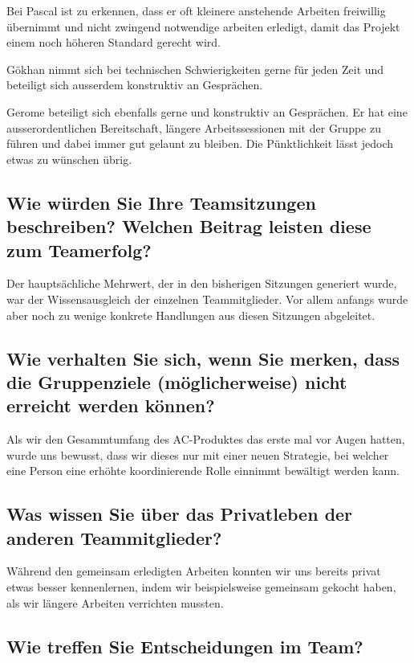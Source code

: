 Bei Pascal ist zu erkennen, dass er oft kleinere anstehende Arbeiten freiwillig übernimmt und nicht zwingend notwendige arbeiten erledigt, damit das Projekt einem noch höheren Standard gerecht wird. 

Gökhan nimmt sich bei technischen Schwierigkeiten gerne für jeden Zeit und beteiligt sich ausserdem konstruktiv an Gesprächen.  

Gerome beteiligt sich ebenfalls gerne und konstruktiv an Gesprächen. Er hat eine ausserordentlichen Bereitschaft, längere Arbeitssessionen mit der Gruppe zu führen und dabei immer gut gelaunt zu bleiben. Die Pünktlichkeit lässt jedoch etwas zu wünschen übrig.  

\subsection*{Wie würden Sie Ihre Teamsitzungen beschreiben? Welchen Beitrag leisten diese zum
Teamerfolg?}

Der hauptsächliche Mehrwert, der in den bisherigen Sitzungen generiert wurde, war der Wissensausgleich der einzelnen Teammitglieder. Vor allem anfangs wurde aber noch zu wenige konkrete Handlungen aus diesen Sitzungen abgeleitet. 

\subsection*{Wie verhalten Sie sich, wenn Sie merken, dass die Gruppenziele (möglicherweise)
nicht erreicht werden können?}

Als wir den Gesammtumfang des AC-Produktes das erste mal vor Augen hatten, wurde uns bewusst, dass wir dieses nur mit einer neuen Strategie, bei welcher eine Person eine erhöhte koordinierende Rolle einnimmt bewältigt werden kann. 

\subsection*{Was wissen Sie über das Privatleben der anderen Teammitglieder?}

Während den gemeinsam erledigten Arbeiten konnten wir uns bereits privat etwas besser kennenlernen, indem wir beispielsweise gemeinsam gekocht haben, als wir längere Arbeiten verrichten mussten. 

\subsection*{Wie treffen Sie Entscheidungen im Team?}

